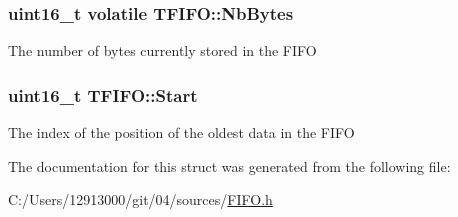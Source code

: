 \subsubsection[{Nb\+Bytes}]{\setlength{\rightskip}{0pt plus 5cm}uint16\+\_\+t volatile T\+F\+I\+F\+O\+::\+Nb\+Bytes}\label{struct_t_f_i_f_o_ace00017651a266a66a93aa5220967611}
The number of bytes currently stored in the F\+I\+F\+O \hypertarget{struct_t_f_i_f_o_a092a7559431a12616672354641908167}{}
\subsubsection[{Start}]{\setlength{\rightskip}{0pt plus 5cm}uint16\+\_\+t T\+F\+I\+F\+O\+::\+Start}\label{struct_t_f_i_f_o_a092a7559431a12616672354641908167}
The index of the position of the oldest data in the F\+I\+F\+O 

The documentation for this struct was generated from the following file\+:\begin{DoxyCompactItemize}
\item 
C\+:/\+Users/12913000/git/04/sources/\hyperlink{_f_i_f_o_8h}{F\+I\+F\+O.\+h}\end{DoxyCompactItemize}
